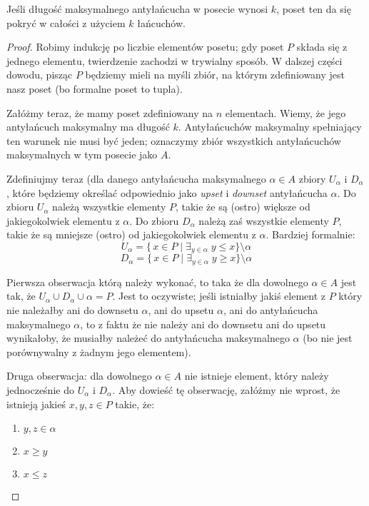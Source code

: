  \begin{theorem}
      Jeśli długość maksymalnego antyłańcucha w posecie wynosi $k$, poset ten da się pokryć w całości z użyciem $k$ łańcuchów.
    \end{theorem}

    \begin{proof}
        Robimy indukcję po liczbie elementów posetu; gdy poset \(P\) składa się z jednego elementu, twierdzenie zachodzi w trywialny sposób. W dalszej części dowodu, pisząc \(P\) będziemy mieli na myśli zbiór, na którym zdefiniowany jest nasz poset (bo formalne poset to tupla).
        
        Załóżmy teraz, że mamy poset zdefiniowany na \(n\) elementach. Wiemy, że jego antyłańcuch maksymalny ma długość \(k\). Antyłańcuchów maksymalny spełniający ten warunek nie musi być jeden; oznaczymy zbiór wszystkich antyłańcuchów maksymalnych w tym posecie jako \(A\).
        
        Zdefiniujmy teraz (dla danego antyłańcucha maksymalnego \( \alpha \in A\) zbiory \(U_{\alpha}\) i \(D_{\alpha}\), które będziemy określać odpowiednio jako \textit{upset} i \textit{downset} antyłańcucha \(\alpha\). Do zbioru \(U_{\alpha}\) należą wszystkie elementy \(P\), takie że są (ostro) większe od jakiegokolwiek elementu z \(\alpha\). Do zbioru \(D_{\alpha}\) należą zaś wszystkie elementy \(P\), takie że są mniejsze (ostro) od jakiegokolwiek elementu z \(\alpha\). Bardziej formalnie:
        \begin{equation*}
            U_{\alpha} = \{\,x \in P \mid \exists_{y \in \alpha} \;  y \leq x \} \setminus \alpha
        \end{equation*}
        \begin{equation*}
            D_{\alpha} = \{\,x \in P \mid \exists_{y \in \alpha} \; y \geq x \} \setminus \alpha
        \end{equation*}

        Pierwsza obserwacja którą należy wykonać, to taka że dla dowolnego \(\alpha \in A\) jest tak, że  \(U_{\alpha} \cup D_{\alpha} \cup \alpha = P\). Jest to oczywiste; jeśli istniałby jakiś element z \(P\) który nie należałby ani do downsetu \(\alpha\), ani do upsetu \(\alpha\), ani do antyłańcucha maksymalnego \(\alpha\), to z faktu że nie należy ani do downsetu ani do upsetu wynikałoby, że musiałby należeć do antyłańcucha maksymalnego \(\alpha\) (bo nie jest porównywalny z żadnym jego elementem).
        
        Druga obserwacja: dla dowolnego \(\alpha \in A\) nie istnieje element, który należy jednocześnie do \(U_{\alpha}\) i \(D_{\alpha}\). Aby dowieść tę obserwację, załóżmy nie wprost, że istnieją jakieś \(x, y, z \in P\) takie, że:
        \begin{enumerate}
            \item \(y, z \in \alpha\)
            \item \( x \geq y\)
            \item \( x \leq z\) 
        \end{enumerate}
        

\end{proof}
